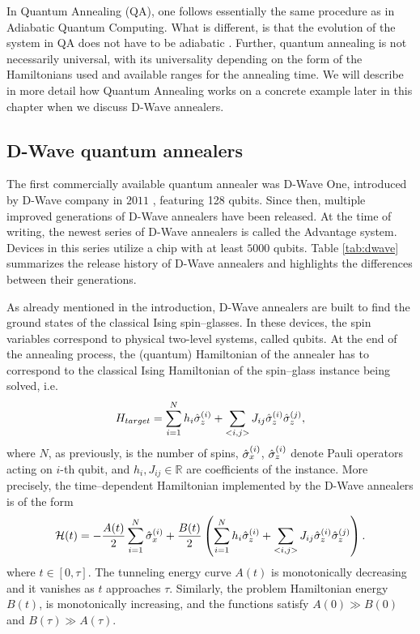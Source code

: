 In Quantum Annealing (QA), one follows essentially the same procedure as in Adiabatic Quantum
Computing. What is different, is that the evolution of the system in QA does not have to be
adiabatic \cite{Vinci2017}. Further, quantum annealing is not necessarily universal, with its
universality depending on the form of the Hamiltonians used and available ranges for the annealing
time. We will describe in more detail how Quantum Annealing works on a concrete example later in
this chapter when we discuss D-Wave annealers.

\subsection{D-Wave quantum annealers}

The first commercially available quantum annealer was D-Wave One, introduced by D-Wave company in
$2011$ \cite{johnson}, featuring 128 qubits. Since then, multiple improved generations of D-Wave
annealers have been released. At the time of writing, the newest series of D-Wave annealers is
called the Advantage system. Devices in this series utilize a chip with at least
$5000$ qubits. Table \ref{tab:dwave} summarizes the release history of D-Wave annealers and
highlights the differences between their generations.

As already mentioned in the introduction, D-Wave annealers are built to find the ground states of
the classical Ising spin--glasses. In these devices, the spin variables correspond to physical
two-level systems, called qubits. At the end of the annealing process, the (quantum)
Hamiltonian of the annealer has to correspond to the classical Ising Hamiltonian of the spin--glass
instance being solved, i.e.
\begin{equation}
H_{target} = \sum_{i=1}^N h_i \hat{\sigma}^{(i)}_z + \sum_{<i, j>} J_{ij} \hat{\sigma}^{(i)}_z \hat{\sigma}^{(j)}_z,
\end{equation}
where $N$, as previously, is the number of spins, $\hat{\sigma}^{(i)}_x$, $\hat{\sigma}^{(i)}_z$ denote
Pauli operators acting on $i$-th qubit, and $h_i, J_{ij} \in \mathbb{R}$ are coefficients of the
instance. More precisely, the time--dependent Hamiltonian implemented by the D-Wave annealers is of the form
\begin{equation}
    \label{eq:dwaveham}
    \mathcal{H}(t) =  -\frac{A(t)}{2}\sum_{i=1}^N \hat{\sigma}^{(i)}_x + \frac{B(t)}{2}\left(\sum_{i=1}^N h_i \hat{\sigma}^{(i)}_z + \sum_{<i, j>} J_{ij} \hat{\sigma}^{(i)}_z \hat{\sigma}^{(j)}_z\right).
\end{equation}
where $t \in [0, \tau]$. The tunneling energy curve $A(t)$ is monotonically decreasing and it
vanishes as $t$ approaches $\tau$. Similarly, the problem Hamiltonian energy $B(t)$, is
monotonically increasing, and the functions satisfy $A(0) \gg B(0)$ and $B(\tau) \gg A(\tau)$.

